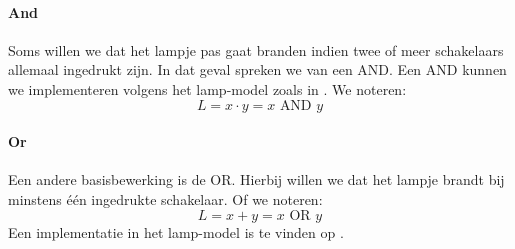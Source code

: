 \paragraph{And}
Soms willen we dat het lampje pas gaat branden indien twee of meer schakelaars allemaal ingedrukt zijn. In dat geval spreken we van een AND. Een AND kunnen we implementeren volgens het lamp-model zoals in . We noteren:
\begin{equation}
L=x\cdot y=x\mbox{ AND }y
\end{equation}
\paragraph{Or}
Een andere basisbewerking is de OR. Hierbij willen we dat het lampje brandt bij minstens \'e\'en ingedrukte schakelaar. Of we noteren:
\begin{equation}
L=x+y=x\mbox{ OR } y
\end{equation}
Een implementatie in het lamp-model is te vinden op .
